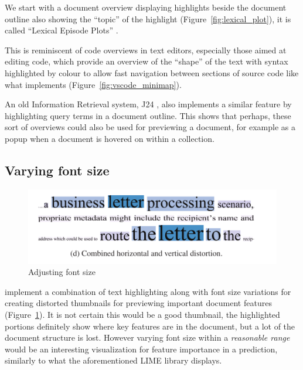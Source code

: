 \documentclass[\version]{l4proj}
\begin{document}
We start with a document overview displaying highlights beside the document outline also showing the ``topic'' of the highlight (Figure~\ref{fig:lexical_plot}), it is called ``Lexical Episode Plots'' \autocite{el-assadyVisArgueVisualText2016,goldExploratoryTextAnalysis2015}.

This is reminiscent of code overviews in text editors, especially those aimed at editing code, which provide an overview of the ``shape'' of the text with syntax highlighted by colour to allow fast navigation between sections of source code like what \textcite{MicrosoftVscode2020} implements (Figure~\ref{fig:vscode_minimap}).

An old Information Retrieval system, J24 \autocite[7]{ogdenDocumentThumbnailVisualizations1998}, also implements a similar feature by highlighting query terms in a document outline.
This shows that perhaps, these sort of overviews could also be used for previewing a document, for example as a popup when a document is hovered on within a collection.

\subsection{Varying font size}

\begin{figure}
    \includegraphics[width=\linewidth]{images/document_visualization/font-size.png}
    \caption{Adjusting font size}\label{fig:font-size}
    \vspace{-5pt}
\end{figure}

\textcite{stoffelDocumentThumbnailsVariable2012} implement a combination of text highlighting along with font size variations for creating distorted thumbnails for previewing important document features (Figure~\ref{fig:font-size}).
It is not certain this would be a good thumbnail, the highlighted portions definitely show where key features are in the document, but a lot of the document structure is lost.
However varying font size within a \textit{reasonable range} would be an interesting visualization for feature importance in a prediction, similarly to what the aforementioned LIME library displays.
\end{document}
